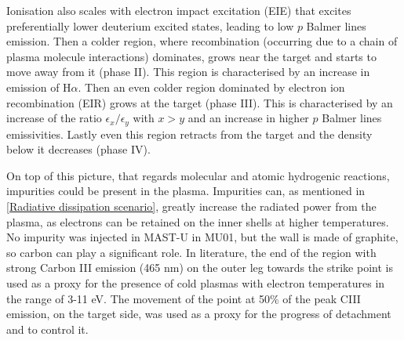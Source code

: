 Ionisation also scales with electron impact excitation (EIE) that excites preferentially lower deuterium excited states, leading to low $p$ Balmer lines emission. Then a colder region, where recombination (occurring due to a chain of plasma molecule interactions) dominates, grows near the target and starts to move away from it (phase II). This region is characterised by an increase in emission of H$\alpha$. Then an even colder region dominated by electron ion recombination (EIR) grows at the target (phase III). This is characterised by an increase of the ratio $\epsilon_x / \epsilon_y$ with $x>y$ and an increase in higher $p$ Balmer lines emissivities. Lastly even this region retracts from the target and the density below it decreases (phase IV).

On top of this picture, that regards molecular and atomic hydrogenic reactions, impurities could be present in the plasma. Impurities can, as mentioned in \autoref{Radiative dissipation scenario}, greatly increase the radiated power from the plasma, as electrons can be retained on the inner shells at higher temperatures. No impurity was injected in MAST-U in MU01, but the wall is made of graphite, so carbon can play a significant role. In literature, the end of the region with strong Carbon III emission (465 nm) on the outer leg towards the strike point is used as a proxy for the presence of cold plasmas with electron temperatures in the range of 3-11 eV.\cite{Reimerdes2017,Smolders2020a,Harrison2017} The movement of the point at 50\% of the peak CIII emission, on the target side, was used as a proxy for the progress of detachment and to control it.\cite{Ravensbergen2020}

